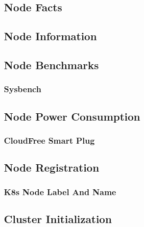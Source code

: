 \subsection{Node Facts}
\label{subsec:implementation_installer_node_facts}

\subsection{Node Information}
\label{subsec:implementation_installer_node_information}

\subsection{Node Benchmarks}
\label{subsec:implementation_installer_node_benchmarks}

\subsubsection{Sysbench}
\label{subsubsec:implementation_installer_node_benchmarks_sysbench}

\subsection{Node Power Consumption}
\label{subsec:implementation_installer_node_power_consumption}

\subsubsection{CloudFree Smart Plug}
\label{subsubsec:implementation_installer_node_power_consumption_cloudfree_smart_plug}

\subsection{Node Registration}
\label{subsec:implementation_installer_node_registration}

\subsubsection{K8s Node Label And Name}
\label{subsubsec:implementation_installer_node_registration_k8s_node_label_and_name}

\subsection{Cluster Initialization}
\label{subsec:implementation_installer_cluster_initialization}

